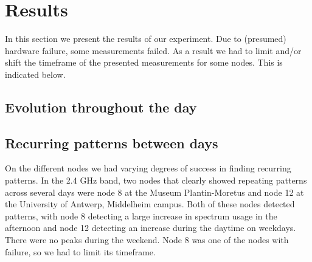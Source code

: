 \documentclass[a4paper, 11pt]{article}
\begin{document}
\section{Results}
In this section we present the results of our experiment. Due to (presumed) hardware failure, some measurements failed. As a result we had to limit and/or shift the timeframe of the presented measurements for some nodes. This is indicated below.
\subsection{Evolution throughout the day}

\subsection{Recurring patterns between days} 
On the different nodes we had varying degrees of success in finding recurring patterns. In the 2.4 GHz band, two nodes that clearly showed repeating patterns across several days were node 8 at the Museum Plantin-Moretus and node 12 at the University of Antwerp, Middelheim campus. Both of these nodes detected patterns, with node 8 detecting a large increase in spectrum usage in the afternoon and node 12 detecting an increase during the daytime on weekdays. There were no peaks during the weekend. Node 8 was one of the nodes with failure, so we had to limit its timeframe.
\end{document}

